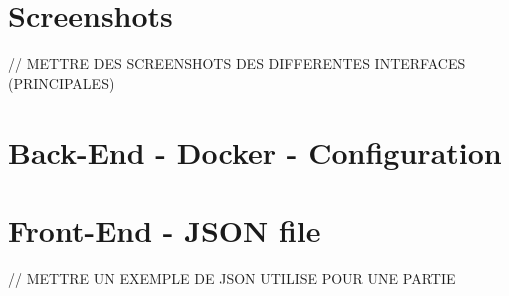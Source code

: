 \documentclass{tnreport}
\begin{document}
\chapter{Screenshots}

// METTRE DES SCREENSHOTS DES DIFFERENTES INTERFACES (PRINCIPALES) \\

\cleardoublepage

\chapter{Back-End - Docker - Configuration}
\label{annexe:docker_compose}
\vspace{0.5cm}
\begin{center}
	\vspace*{-0.8in}
	
\end{center}

\cleardoublepage

\chapter{Front-End - JSON file}

// METTRE UN EXEMPLE DE JSON UTILISE POUR UNE PARTIE \\
\end{document}
